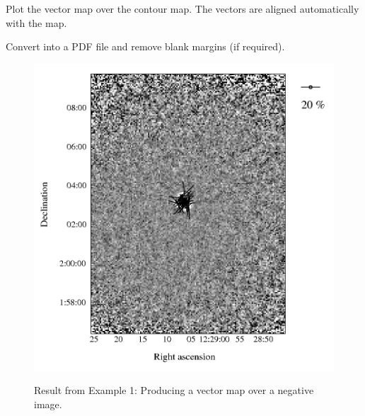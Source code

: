 Plot the vector map over the contour map. The vectors are aligned automatically with the map.

\begin{terminalv}
\end{terminalv}


Convert into a PDF file and remove blank margins (if required).

\begin{terminalv}
\end{terminalv}


\begin{figure}[t!]
\begin{center}
\includegraphics[width=0.75\linewidth]{sc22-kappa-plots-plot3.png}
\label{fig:kappa-plot3}
\caption [Vector map with negative image in polplot]{
  \small Result from Example 1: Producing a vector map over a negative image. 
}
\end{center}
\end{figure}


